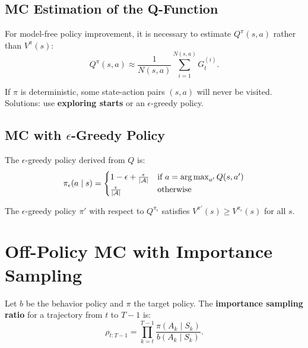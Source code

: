 \subsection{MC Estimation of the Q-Function}

For model-free policy improvement, it is necessary to estimate $Q^\pi(s,a)$
rather than $V^\pi(s)$:
\[
    Q^\pi(s,a) \approx \frac{1}{N(s,a)} \sum_{i=1}^{N(s,a)} G_t^{(i)}.
\]

\begin{warning}[title=\textbf{Exploration Problem}]
If $\pi$ is deterministic, some state-action pairs $(s,a)$ will never be
visited. Solutions: use \textbf{exploring starts} or an $\epsilon$-greedy policy.
\end{warning}

\subsection{MC with $\epsilon$-Greedy Policy}

\begin{definition}
The $\epsilon$-greedy policy derived from $Q$ is:
\[
    \pi_\epsilon(a \mid s) = \begin{cases}
        1 - \epsilon + \frac{\epsilon}{|\mathcal{A}|} & \text{if } a = \operatorname*{arg\,max}_{a'} Q(s,a') \\
        \frac{\epsilon}{|\mathcal{A}|} & \text{otherwise}
    \end{cases}
\]
\end{definition}

\begin{theorem}
The $\epsilon$-greedy policy $\pi'$ with respect to $Q^{\pi_\epsilon}$
satisfies $V^{\pi'}(s) \geq V^{\pi_\epsilon}(s)$ for all $s$.
\end{theorem}

\section{Off-Policy MC with Importance Sampling}

\begin{definition}
Let $b$ be the behavior policy and $\pi$ the target policy. The
\textbf{importance sampling ratio} for a trajectory from $t$ to $T-1$ is:
\[
    \rho_{t:T-1} = \prod_{k=t}^{T-1} \frac{\pi(A_k \mid S_k)}{b(A_k \mid S_k)}.
\]
\end{definition}

